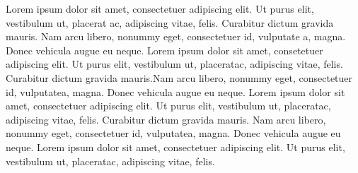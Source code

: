 
%
{Lorem ipsum dolor sit amet, consectetuer adipiscing elit. Ut purus elit, vestibulum ut, placerat ac, adipiscing vitae, felis. Curabitur dictum gravida mauris. Nam arcu libero, nonummy eget, consectetuer id, vulputate a, magna. Donec vehicula augue eu neque. Lorem ipsum dolor sit amet, consetetuer adipiscing elit. Ut purus elit, vestibulum ut, placeratac, adipiscing vitae, felis. Curabitur dictum gravida mauris.Nam arcu libero, nonummy eget, consectetuer id, vulputatea, magna. Donec vehicula augue eu neque. Lorem ipsum dolor sit amet, consectetuer adipiscing elit. Ut purus elit, vestibulum ut, placeratac, adipiscing vitae, felis. Curabitur dictum gravida mauris. Nam arcu libero, nonummy eget, consectetuer id, vulputatea, magna. Donec vehicula augue eu neque. Lorem ipsum dolor sit amet, consectetuer adipiscing elit. Ut purus elit, vestibulum ut, placeratac, adipiscing vitae, felis.}


